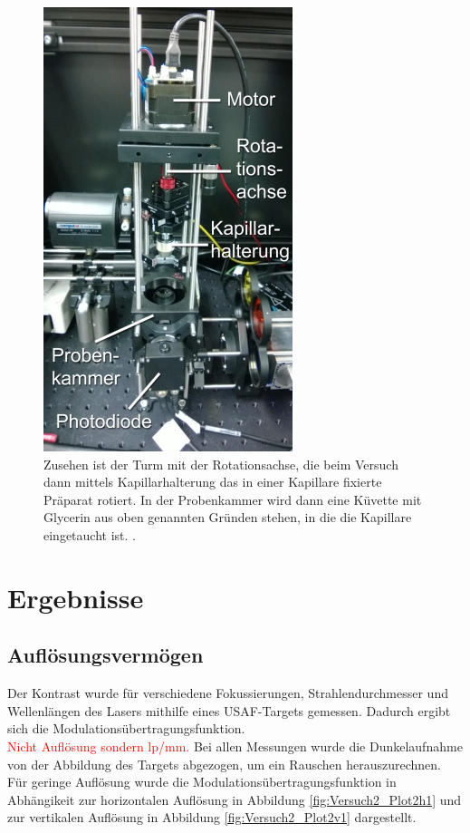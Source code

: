\clearpage

\begin{minipage}{\linewidth}
\begin{figure}[H]
	\centering
\includegraphics[width=0.491\linewidth]{IMAGE/turm.png}
	\caption{Zusehen ist der Turm mit der Rotationsachse, die beim Versuch dann mittels Kapillarhalterung das in einer Kapillare fixierte Präparat rotiert.
In der Probenkammer wird dann eine Küvette mit Glycerin aus oben genannten Gründen stehen, in die die Kapillare eingetaucht ist. \cite{Anleitung}.
	}
	\label{fig:turm}
\end{figure}

\section{Ergebnisse}
\subsection{Auflösungsvermögen}
Der Kontrast wurde für verschiedene Fokussierungen, Strahlendurchmesser und Wellenlängen des Lasers mithilfe eines USAF-Targets gemessen. Dadurch ergibt sich die Modulationsübertragungsfunktion.\\ 
 \textcolor{red}{Nicht Auflösung sondern lp/mm.}
Bei allen Messungen wurde die Dunkelaufnahme von der Abbildung des Targets abgezogen, um ein Rauschen herauszurechnen.\\
Für geringe Auflösung wurde die Modulationsübertragungsfunktion  in Abhängikeit zur horizontalen Auflösung in Abbildung \ref{fig:Versuch2_Plot2h1} und zur vertikalen Auflösung in Abbildung \ref{fig:Versuch2_Plot2v1} dargestellt.\\
\end{minipage}

